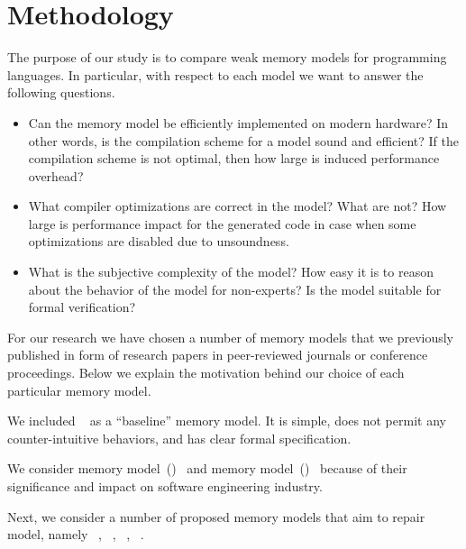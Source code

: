 \section{Methodology}

The purpose of our study is to compare weak memory models for programming languages.
In particular, with respect to each model we want to answer the following questions.

\begin{itemize}
  
  \item Can the memory model be efficiently implemented on modern hardware? 
    In other words, is the compilation scheme for a model sound and efficient?
    If the compilation scheme is not optimal, then how large is induced performance overhead?

  \item What compiler optimizations are correct in the model? What are not? 
    How large is performance impact for the generated code in case when 
    some optimizations are disabled due to unsoundness.

  \item What is the subjective complexity of the model?
    How easy it is to reason about the behavior of the model for non-experts?
    Is the model suitable for formal verification?
  
\end{itemize}

For our research we have chosen a number of memory models 
that we previously published in form of research papers 
in peer-reviewed journals or conference proceedings. 
Below we explain the motivation behind our choice of each particular memory model.  



We included \SC~\cite{Lamport:TC79}
as a ``baseline'' memory model. 
It is simple, does not permit any counter-intuitive behaviors,
and has clear formal specification. 

We consider \Java memory model~(\JMM)~\cite{Manson-al:POPL05}
and \CPP memory model~(\CMM)~\cite{Boehm-Adve:PLDI08, Batty-al:POPL11}
because of their significance and impact on software engineering industry.

Next, we consider a number of proposed memory models 
that aim to repair \CPP model, namely 
\RCMM~\cite{Lahav-al:PLDI17}, 
\Promising~\cite{Kang-al:POPL17, Lee-el:PLDI20}, 
\Weakest~\cite{Chakraborty-Vafeiadis:POPL19}, 
\MRD~\cite{Paviotti-el:ESOP20}.

